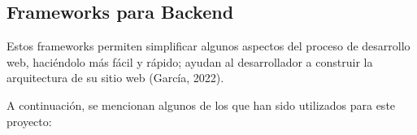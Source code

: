 \subsection{Frameworks para Backend}
Estos frameworks permiten simplificar algunos aspectos del proceso de desarrollo web, haciéndolo más fácil y rápido; ayudan al desarrollador a construir la arquitectura de su sitio web (García, 2022).

A continuación, se mencionan algunos de los que han sido utilizados para este proyecto: 
    
    
